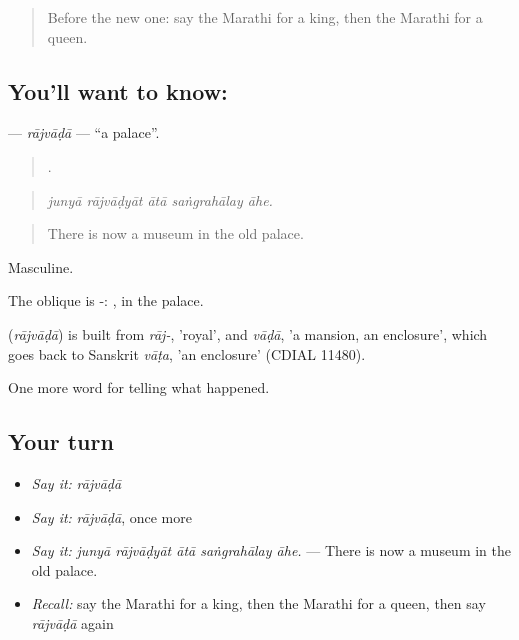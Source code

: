 \label{lesson:MR-C325-rajvada}



\begin{quote}
Before the new one: say the Marathi for a king, then the Marathi for a queen.
\end{quote}

\subsection*{You'll want to know: }
\textbf{} — \emph{rājvāḍā} — \textquotedblleft{}a palace\textquotedblright{}.

\begin{quote}
    .
\end{quote}

\begin{quote}
\emph{junyā rājvāḍyāt ātā saṅgrahālay āhe.}
\end{quote}

\begin{quote}
There is now a museum in the old palace.
\end{quote}

Masculine.

The oblique is -: , in the palace.

\begin{cousinweb}
\textbf{} (\emph{rājvāḍā}) is built from \emph{rāj-}, 'royal', and \emph{vāḍā}, 'a mansion, an enclosure', which goes back to Sanskrit \emph{vāṭa}, 'an enclosure' (CDIAL 11480).
\end{cousinweb}

\begin{grammarlens}[title={What you've built}]
One more word for telling what happened.
\end{grammarlens}

\subsection*{Your turn}
\begin{itemize}
\raggedright
  \item \emph{Say it:} \emph{rājvāḍā}
  \item \emph{Say it:} \emph{rājvāḍā}, once more
  \item \emph{Say it:} \emph{junyā rājvāḍyāt ātā saṅgrahālay āhe.} — There is now a museum in the old palace.
  \item \emph{Recall:} say the Marathi for a king, then the Marathi for a queen, then say \emph{rājvāḍā} again
\end{itemize}

